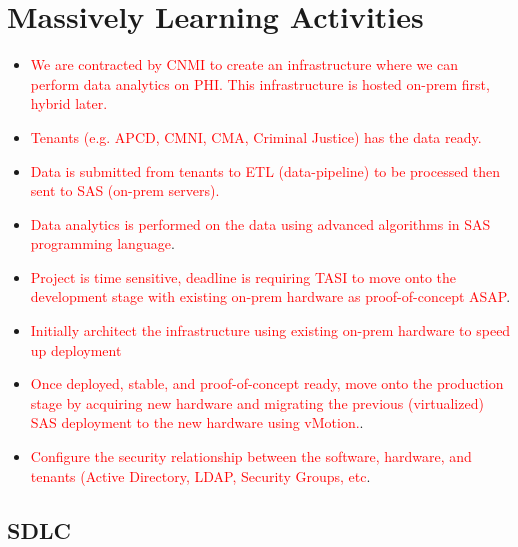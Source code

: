 \section{Massively Learning Activities} \label{section: MLA}
\begin{itemize}
    \item \textcolor{red}{We are contracted by CNMI to create an infrastructure where we can perform data analytics on PHI. This infrastructure is hosted on-prem first, hybrid later.}
    \item \textcolor{red}{Tenants (e.g. APCD, CMNI, CMA, Criminal Justice) has the data ready.}
    \item \textcolor{red}{Data is submitted from tenants to ETL (data-pipeline) to be processed then sent to SAS (on-prem servers).}
    \item \textcolor{red}{Data analytics is performed on the data using advanced algorithms in SAS programming language}. 
    \item \textcolor{red}{Project is time sensitive, deadline is requiring TASI to move onto the development stage with existing on-prem hardware as proof-of-concept ASAP}.
    \item \textcolor{red}{Initially architect the infrastructure using existing on-prem hardware to speed up deployment}
    \item \textcolor{red}{Once deployed, stable, and proof-of-concept ready, move onto the production stage by acquiring new hardware and migrating the previous (virtualized) SAS deployment to the new hardware using vMotion.}.
    \item \textcolor{red}{Configure the security relationship between the software, hardware, and tenants (Active Directory, LDAP, Security Groups, etc}.
\end{itemize}

\subsection{SDLC}